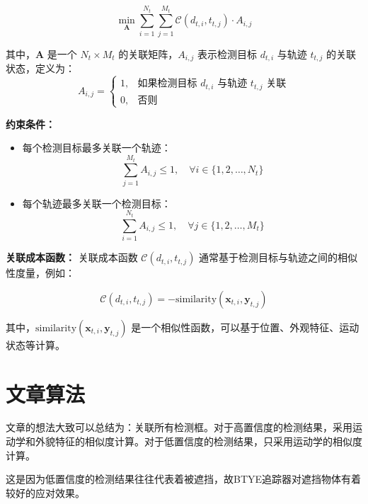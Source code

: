 \begin{tcolorbox}
	
	\begin{equation}
		\min_{\mathbf{A}} \sum_{i=1}^{N_t} \sum_{j=1}^{M_t} \mathcal{C}(d_{t,i}, t_{t,j}) \cdot A_{i,j}
	\end{equation}
	
	\hspace{22pt}其中，\(\mathbf{A}\) 是一个 \(N_t \times M_t\) 的关联矩阵，\(A_{i,j}\) 表示检测目标 \(d_{t,i}\) 与轨迹 \(t_{t,j}\) 的关联状态，定义为：
	\[
	A_{i,j} = \begin{cases} 
		1, & \text{如果检测目标 } d_{t,i} \text{ 与轨迹 } t_{t,j} \text{ 关联} \\
		0, & \text{否则}
	\end{cases}
	\]
	
	\hspace{22pt}\textbf{约束条件：}
	
	\begin{itemize}
		\item 每个检测目标最多关联一个轨迹：
		\[
		\sum_{j=1}^{M_t} A_{i,j} \leq 1, \quad \forall i \in \{1, 2, \ldots, N_t\}
		\]
		\item 每个轨迹最多关联一个检测目标：
		\[
		\sum_{i=1}^{N_t} A_{i,j} \leq 1, \quad \forall j \in \{1, 2, \ldots, M_t\}
		\]
	\end{itemize}
	
	\hspace{22pt}\textbf{关联成本函数：}
	关联成本函数 \(\mathcal{C}(d_{t,i}, t_{t,j})\) 通常基于检测目标与轨迹之间的相似性度量，例如：
	
	\[
	\mathcal{C}(d_{t,i}, t_{t,j}) = -\text{similarity}(\mathbf{x}_{t,i}, \mathbf{y}_{t,j})
	\]
	
	其中，\(\text{similarity}(\mathbf{x}_{t,i}, \mathbf{y}_{t,j})\) 是一个相似性函数，可以基于位置、外观特征、运动状态等计算。
	
\end{tcolorbox}

\section{文章算法}

文章的想法大致可以总结为：关联所有检测框。对于高置信度的检测结果，采用运动学和外貌特征的相似度计算。对于低置信度的检测结果，只采用运动学的相似度计算。

这是因为低置信度的检测结果往往代表着被遮挡，故BTYE追踪器对遮挡物体有着较好的应对效果。

